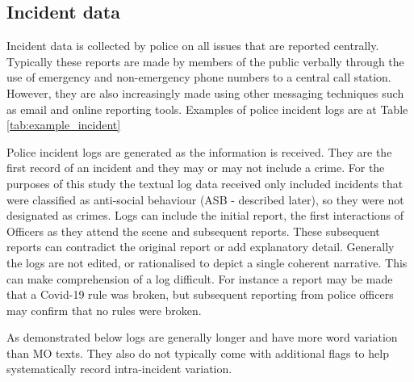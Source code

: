 \subsection{Incident data} Incident data is collected by police on all issues that are reported centrally. Typically these reports are made by members of the public verbally through the use of emergency and non-emergency phone numbers to a central call station. However, they are also increasingly made using other messaging techniques such as email and online reporting tools. Examples of police incident logs are at Table \ref{tab:example_incident} 

Police incident logs are generated as the information is received. They are the first record of an incident and they may or may not include a crime. For the purposes of this study the textual log data received only included incidents that were classified as anti-social behaviour (ASB - described later), so they were not designated as crimes. Logs can include the initial report, the first interactions of Officers as they attend the scene and subsequent reports. These subsequent reports can contradict the original report or add explanatory detail. Generally the logs are not edited, or rationalised to depict a single coherent narrative. This can make comprehension of a log difficult. For instance a report may be made that a Covid-19 rule was broken, but subsequent reporting from police officers may confirm that no rules were broken.

As demonstrated below logs are generally longer and have more word variation than MO texts. They also do not typically come with additional flags to help systematically record intra-incident variation.


